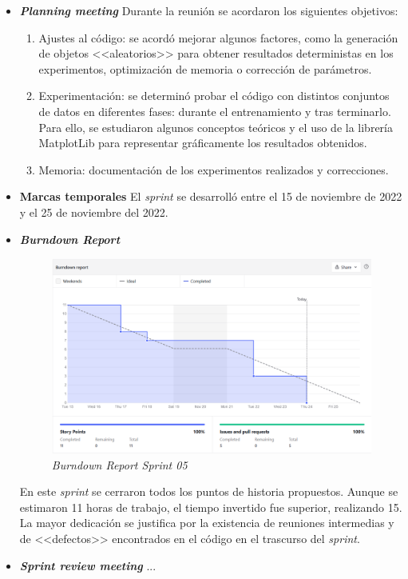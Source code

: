 \begin{itemize}
	\item \textbf{\textit{Planning meeting}}
		Durante la reunión se acordaron los siguientes objetivos:
	
	\begin{enumerate}
		\item Ajustes al código: se acordó mejorar algunos factores, como la generación de objetos <<aleatorios>> para obtener resultados deterministas en los experimentos, optimización de memoria o corrección de parámetros.
		\item Experimentación: se determinó probar el código con distintos conjuntos de datos en diferentes fases: durante el entrenamiento y tras terminarlo. Para ello, se estudiaron algunos conceptos teóricos y el uso de la librería MatplotLib para representar gráficamente los resultados obtenidos.
		\item Memoria: documentación de los experimentos realizados y correcciones.
	\end{enumerate}

	\item \textbf{Marcas temporales}		
	El \textit{sprint} se desarrolló entre el 15 de noviembre de 2022 y el 25 de noviembre del 2022.
	
	\item \textbf{\textit{Burndown Report}}
		\begin{figure}[h]
		\caption{\textit{Burndown Report Sprint 05}}
		\centering
		\includegraphics[width=\textwidth]{../img/anexos/s05_bdr}
	\end{figure}
	
	En este \textit{sprint} se cerraron todos los puntos de historia propuestos. Aunque se estimaron 11 horas de trabajo, el tiempo invertido fue superior, realizando 15. La mayor dedicación se justifica por la existencia de reuniones intermedias y de <<defectos>> encontrados en el código en el trascurso del \textit{sprint}.
	
	\item \textbf{\textit{Sprint review meeting}}
	...
	
\end{itemize}



